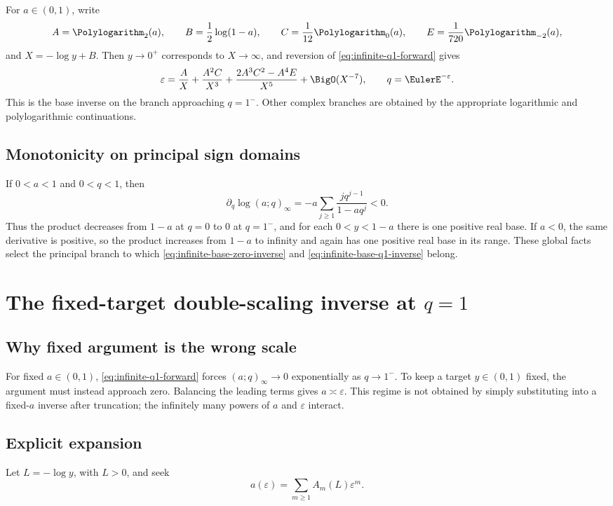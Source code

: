 \documentclass[11pt,letterpaper,oneside,openany]{book}
\theoremstyle{definition}
\theoremstyle{remark}
\begin{document}
For \(a\in(0,1)\), write
\[
 A=\Polylogarithm_2(a),
 \qquad B=\frac12\log(1-a),
 \qquad C=\frac1{12}\Polylogarithm_0(a),
 \qquad E=\frac1{720}\Polylogarithm_{-2}(a),
\]
and \(X=-\log y+B\).  Then \(y\to0^+\) corresponds to \(X\to\infty\), and
reversion of \cref{eq:infinite-q1-forward} gives
\begin{equation}
 \varepsilon=
 \frac{A}{X}+\frac{A^2C}{X^3}
 +\frac{2A^3C^2-A^4E}{X^5}
 +\BigO(X^{-7}),
 \qquad q=\EulerE^{-\varepsilon}.
 \label{eq:infinite-base-q1-inverse}
\end{equation}
This is the base inverse on the branch approaching \(q=1^-\).  Other complex
branches are obtained by the appropriate logarithmic and polylogarithmic
continuations.

\section{Monotonicity on principal sign domains}
If \(0<a<1\) and \(0<q<1\), then
\[
 \partial_q\log(a;q)_\infty
 =-a\sum_{j\ge1}\frac{jq^{j-1}}{1-aq^j}<0.
\]
Thus the product decreases from \(1-a\) at \(q=0\) to \(0\) at \(q=1^-\), and
for each \(0<y<1-a\) there is one positive real base.  If \(a<0\), the same
derivative is positive, so the product increases from \(1-a\) to infinity and
again has one positive real base in its range.  These global facts select the
principal branch to which \cref{eq:infinite-base-zero-inverse} and
\cref{eq:infinite-base-q1-inverse} belong.

\chapter{The fixed-target double-scaling inverse at \(q=1\)}

\section{Why fixed argument is the wrong scale}
For fixed \(a\in(0,1)\), \cref{eq:infinite-q1-forward} forces
\((a;q)_\infty\to0\) exponentially as \(q\to1^-\).  To keep a target
\(y\in(0,1)\) fixed, the argument must instead approach zero.  Balancing the
leading terms gives \(a\asymp\varepsilon\).  This regime is not obtained by
simply substituting into a fixed-\(a\) inverse after truncation; the infinitely
many powers of \(a\) and \(\varepsilon\) interact.

\section{Explicit expansion}
Let \(L=-\log y\), with \(L>0\), and seek
\[
 a(\varepsilon)=\sum_{m\ge1}A_m(L)\varepsilon^m.
\]
\end{document}
